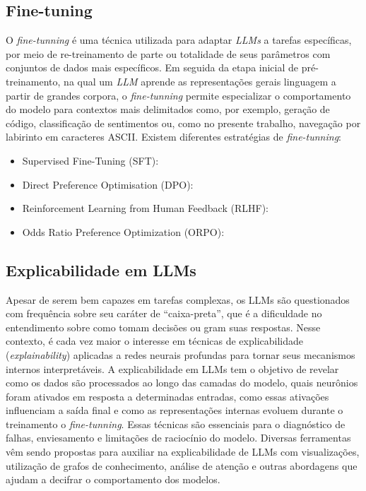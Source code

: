 \documentclass[12pt]{article}
\begin{document}
\subsection{Fine-tuning}

O \textit{fine-tunning} é uma técnica utilizada para adaptar \textit{LLMs} a tarefas específicas, por meio de re-treinamento de parte ou totalidade de seus parâmetros com conjuntos de dados mais específicos. Em seguida da etapa inicial de pré-treinamento, na qual um \textit{LLM} aprende as representações gerais linguagem a partir de grandes corpora, o \textit{fine-tunning} permite especializar o comportamento do modelo para contextos mais delimitados como, por exemplo, geração de código, classificação de sentimentos ou, como no presente trabalho, navegação por labirinto em caracteres ASCII. Existem diferentes estratégias de \textit{fine-tunning}:
\begin{itemize}
    \item Supervised Fine-Tuning (SFT): 
    \item Direct Preference Optimisation (DPO): 
    \item Reinforcement Learning from Human Feedback (RLHF): 
    \item Odds Ratio Preference Optimization (ORPO): 
\end{itemize}

\subsection{Explicabilidade em LLMs}

Apesar de serem bem capazes em tarefas complexas, os LLMs são questionados com frequência sobre seu caráter de ``caixa-preta'', que é a dificuldade no entendimento sobre como tomam decisões ou gram suas respostas. Nesse contexto, é cada vez maior o interesse em técnicas de explicabilidade (\textit{explainability}) aplicadas a redes neurais profundas para tornar seus mecanismos internos interpretáveis. A explicabilidade em LLMs tem o objetivo de revelar como os dados são processados ao longo das camadas do modelo, quais neurônios foram ativados em resposta a determinadas entradas, como essas ativações influenciam a saída final e como as representações internas evoluem durante o treinamento o \textit{fine-tunning}. Essas técnicas são essenciais para o diagnóstico de falhas, enviesamento e limitações de raciocínio do modelo. Diversas ferramentas vêm sendo propostas para auxiliar na explicabilidade de LLMs com visualizações, utilização de grafos de conhecimento, análise de atenção e outras abordagens que ajudam a decifrar o comportamento dos modelos.
\end{document}
